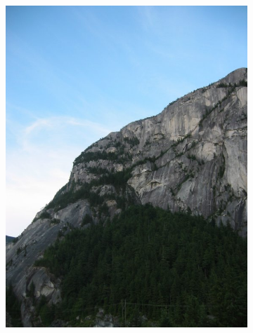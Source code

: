 \documentclass[12pt]{article}
\begin{document}
\begin{figure}[t!]
    \begin{subfigure}[t]{0.3\textwidth}
        \centering
        \includegraphics[width=\linewidth]{../Images/Set2/1}
    \end{subfigure}
    \begin{subfigure}[t]{0.3\textwidth}
        \centering

\end{subfigure}
\end{figure}
\end{document}
